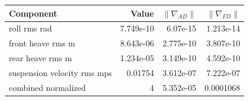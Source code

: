 \begin{tabular}{lrrr}
\toprule
Component & Value & $\|\nabla_{AD}\|$ & $\|\nabla_{FD}\|$ \\ \midrule
roll rms rad & 7.749e-10 & 6.07e-15 & 1.213e-14 \\
front heave rms m & 8.643e-06 & 2.775e-10 & 3.807e-10 \\
rear heave rms m & 1.234e-05 & 3.149e-10 & 4.592e-10 \\
suspension velocity rms mps & 0.01754 & 3.612e-07 & 7.222e-07 \\
combined normalized & 4 & 5.352e-05 & 0.0001068 \\
\bottomrule
\end{tabular}
